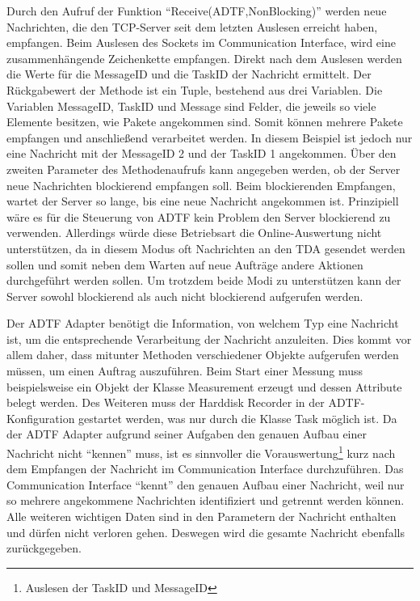 \documentclass[12pt,a4paper]{report}
\begin{document}
Durch den Aufruf der Funktion "`Receive(ADTF,NonBlocking)"' werden neue Nachrichten, die den TCP-Server seit dem letzten Auslesen erreicht haben, empfangen. Beim Auslesen des Sockets im Communication Interface, wird eine zusammenhängende Zeichenkette empfangen. Direkt nach dem Auslesen werden die Werte für die MessageID und die TaskID der Nachricht ermittelt. Der Rückgabewert der Methode ist ein Tuple, bestehend aus drei Variablen. Die Variablen MessageID, TaskID und Message sind Felder, die jeweils so viele Elemente besitzen, wie Pakete angekommen sind. Somit können mehrere Pakete empfangen und anschließend verarbeitet werden. In diesem Beispiel ist jedoch nur eine Nachricht mit der MessageID 2 und der TaskID 1 angekommen. Über den zweiten Parameter des Methodenaufrufs kann angegeben werden, ob der Server neue Nachrichten blockierend empfangen soll. Beim blockierenden Empfangen, wartet der Server so lange, bis eine neue Nachricht angekommen ist. Prinzipiell wäre es für die Steuerung von ADTF kein Problem den Server blockierend zu verwenden. Allerdings würde diese Betriebsart die Online-Auswertung nicht unterstützen, da in diesem Modus oft Nachrichten an den TDA gesendet werden sollen und somit neben dem Warten auf neue Aufträge andere Aktionen durchgeführt werden sollen. Um trotzdem beide Modi zu unterstützen kann der Server sowohl blockierend als auch nicht blockierend aufgerufen werden.

Der ADTF Adapter benötigt die Information, von welchem Typ eine Nachricht ist, um die entsprechende Verarbeitung der Nachricht anzuleiten. Dies kommt vor allem daher, dass mitunter Methoden verschiedener Objekte aufgerufen werden müssen, um einen Auftrag auszuführen. Beim Start einer Messung muss beispielsweise ein Objekt der Klasse Measurement erzeugt und dessen Attribute belegt werden. Des Weiteren muss der Harddisk Recorder in der ADTF-Konfiguration gestartet werden, was nur durch die Klasse Task möglich ist. Da der ADTF Adapter aufgrund seiner Aufgaben den genauen Aufbau einer Nachricht nicht "`kennen"' muss, ist es sinnvoller die Vorauswertung\footnote{Auslesen der TaskID und MessageID} kurz nach dem Empfangen der Nachricht im Communication Interface durchzuführen. Das Communication Interface "`kennt"' den genauen Aufbau einer Nachricht, weil nur so mehrere angekommene Nachrichten identifiziert und getrennt werden können. Alle weiteren wichtigen Daten sind in den Parametern der Nachricht enthalten und dürfen nicht verloren gehen. Deswegen wird die gesamte Nachricht ebenfalls zurückgegeben.
\end{document}
